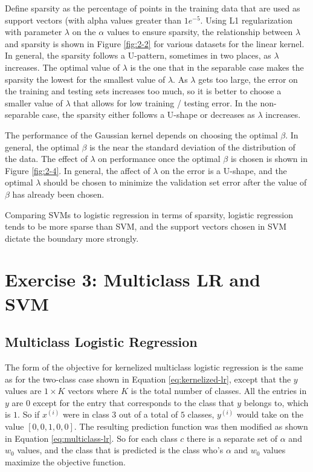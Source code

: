 \documentclass[10pt]{article}
\begin{document}
Define sparsity as the percentage of points in the training data that are used as support vectors (with alpha values greater than $1e^{-5}$. Using L1 regularization with parameter $\lambda$ on the $\alpha$ values to ensure sparsity, the relationship between $\lambda$ and sparsity is shown in Figure \ref{fig:2-2} for various datasets for the linear kernel. In general, the sparsity follows a U-pattern, sometimes in two places, as $\lambda$ increases. The optimal value of $\lambda$ is the one that in the separable case makes the sparsity the lowest for the smallest value of $\lambda$. As $\lambda$ gets too large, the error on the training and testing sets increases too much, so it is better to choose a smaller value of $\lambda$ that allows for low training / testing error. In the non-separable case, the sparsity either follows a U-shape or decreases as $\lambda$ increases.

The performance of the Gaussian kernel depends on choosing the optimal $\beta$. In general, the optimal $\beta$ is the near the standard deviation of the distribution of the data. The effect of $\lambda$ on performance once the optimal $\beta$ is chosen is shown in Figure \ref{fig:2-4}. In general, the affect of $\lambda$ on the error is a U-shape, and the optimal $\lambda$ should be chosen to minimize the validation set error after the value of $\beta$ has already been chosen.

Comparing SVMs to logistic regression in terms of sparsity, logistic regression tends to be more sparse than SVM, and the support vectors chosen in SVM dictate the boundary more strongly.

\section{Exercise 3: Multiclass LR and SVM}

\subsection{Multiclass Logistic Regression}

The form of the objective for kernelized multiclass logistic regression is the same as for the two-class case shown in Equation \ref{eq:kernelized-lr}, except that the $y$ values are $1 \times K$ vectors where $K$ is the total number of classes. All the entries in $y$ are $0$ except for the entry that corresponds to the class that $y$ belongs to, which is $1$. So if $x^{(i)}$ were in class $3$ out of a total of $5$ classes, $y^{(i)}$ would take on the value $[0, 0, 1, 0, 0]$. The resulting prediction function was then modified as shown in Equation \ref{eq:multiclass-lr}. So for each class $c$ there is a separate set of $\alpha$ and $w_0$ values, and the class that is predicted is the class who's $\alpha$ and $w_0$ values maximize the objective function. 
\end{document}
